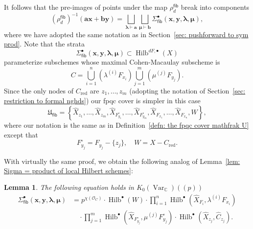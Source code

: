 \documentclass[12pt]{amsart}
\newtheorem{lemma}[theorem]{Lemma}
\theoremstyle{definition}
\newcommand{\CC} {\mathbb{C}}          %
\renewcommand{\O}{\mathcal{O}}
\newcommand{\Hilb}{\operatorname{Hilb}}
\newcommand{\Var}{\operatorname{Var}}
\newcommand{\boldx}{\boldsymbol{x}}
\newcommand{\boldy}{\boldsymbol{y}}
\newcommand{\bolda}{\boldsymbol{a}}
\newcommand{\boldb}{\boldsymbol{b}}
\newcommand{\boldlambda}{\boldsymbol{\lambda }}
\newcommand{\boldmu}{\boldsymbol{\mu }}
\renewcommand{\hat}{\widehat}
\newcommand{\Xhat}{\widehat{X}}
\newcommand{\fiber}{\mathsf{fib}}
\newcommand{\red}{\mathrm{red}}
\begin{document}
It follows that the pre-images of points under the map
$\rho^{\fiber}_{d}$ break into components
\[
\left(\rho_{d}^{\fiber} \right)^{-1}(\bolda \boldx +\boldb \boldy ) =
\bigsqcup_{\boldlambda \vdash \bolda} \bigsqcup_{\boldmu \vdash
\boldb} \Sigma^{\bullet}_{\fiber}(\boldx ,\boldy ,\boldlambda ,\boldmu ),
\]
where we have adopted the same notation as in Section~\ref{sec:
pushforward to sym prod}. Note that the strata
\[
 \Sigma^{\bullet}_{\fiber}(\boldx ,\boldy ,\boldlambda ,\boldmu )
 \subset \Hilb^{dF, \bullet}(X)
\]
parameterize subschemes whose maximal Cohen-Macaulay subscheme is 
\[
C = \bigcup_{i=1}^{n}\left(\lambda^{(i)}F_{x_{i}} \right)
\bigcup_{j=1}^{m}\left(\mu^{(j)}F_{y_{j}} \right) . 
\]
Since the only nodes of $C_{\red}$ are $z_{1},\dotsc ,z_{m}$ (adopting
the notation of Section~\ref{sec: restriction to formal nghds}) our
fpqc cover is simpler in this case
\[
\mathfrak{U}_{\fiber} =\left\{ \Xhat_{z_{1}},\dotsc ,
\Xhat_{z_{m}},\Xhat_{F^{\circ}_{y_{1}}},\dotsc ,
\Xhat_{F^{\circ}_{y_{m}}}, \Xhat_{F_{x_{1}}},\dotsc ,
\Xhat_{F_{x_{n}}}, W   \right\},
\]
where our notation is the same as in Definition~\ref{defn: the fpqc
cover mathfrak U} except that
\[
F^{\circ}_{y_{j}} = F_{y_{j}} - \{z_{j} \}, \quad W = X - C_{\red}. 
\]

With virtually the same proof, we obtain the following analog of
Lemma~\ref{lem: Sigma = product of local Hilbert schemes}:
\begin{lemma}\label{lem: Sigmafiber = product of local Hilbert schemes}
The following equation holds in $K_{0}(\Var_{\CC})(\!(p)\!)$
\begin{align*}
\Sigma^{\bullet}_{\fiber}(\boldx ,\boldy ,\boldlambda ,\boldmu ) &=
p^{\chi (\O_{C})}\cdot \Hilb^{\bullet}(W) \cdot \prod_{i=1}^{n}
\Hilb^{\bullet} \left(\Xhat_{F_{i}},\lambda^{(i)}F_{x_{i}} \right) \\
&\quad \cdot \prod_{j=1}^{m} \Hilb^{\bullet}
\left(\Xhat_{F^{\circ}_{y_{j}}}, \mu^{(j)} F^{\circ}_{y_{j}} \right)
\cdot \Hilb^{\bullet}\left( \Xhat_{z_{j}}, \hat{C}_{z_{j}} \right). 
\end{align*}
\end{lemma}
\end{document}
